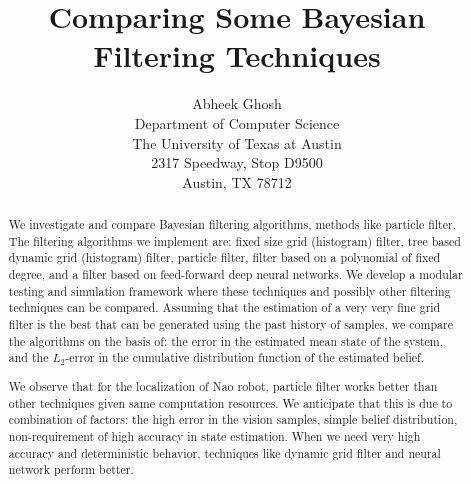 \documentclass[letterpaper]{article} %
\begin{document}
%
\title{Comparing Some Bayesian Filtering Techniques}
\author{Abheek Ghosh\\
Department of Computer Science \\
The University of Texas at Austin \\
2317 Speedway, Stop D9500 \\
Austin, TX 78712 \\
}
\maketitle
\begin{abstract}
We investigate and compare Bayesian filtering algorithms, methods like particle filter. The filtering algorithms we implement are: fixed size grid (histogram) filter, tree based dynamic grid (histogram) filter, particle filter, filter based on a polynomial of fixed degree, and a filter based on feed-forward deep neural networks. We develop a modular testing and simulation framework where these techniques and possibly other filtering techniques can be compared. Assuming that the estimation of a very very fine grid filter is the best that can be generated using the past history of samples, we compare the algorithms on the basis of: the error in the estimated mean state of the system, and the $L_2$-error in the cumulative distribution function of the estimated belief.

We observe that for the localization of Nao robot, particle filter works better than other techniques given same computation resources. We anticipate that this is due to combination of factors: the high error in the vision samples, simple belief distribution, non-requirement of high accuracy in state estimation. When we need very high accuracy and deterministic behavior, techniques like dynamic grid filter and neural network perform better.
\end{abstract}

\noindent





\end{document}
